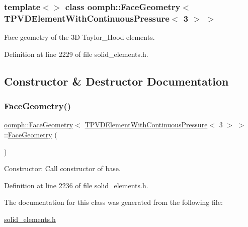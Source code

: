 \subsubsection*{template$<$$>$\newline
class oomph\+::\+Face\+Geometry$<$ T\+P\+V\+D\+Element\+With\+Continuous\+Pressure$<$ 3 $>$ $>$}

Face geometry of the 3D Taylor\+\_\+\+Hood elements. 

Definition at line 2229 of file solid\+\_\+elements.\+h.



\subsection{Constructor \& Destructor Documentation}
\mbox{\label{classoomph_1_1FaceGeometry_3_01TPVDElementWithContinuousPressure_3_013_01_4_01_4_ae0c645d16ae9253ecc4ee97bec72a7c9}} 
\subsubsection{\texorpdfstring{Face\+Geometry()}{FaceGeometry()}}
{\footnotesize\ttfamily \hyperlink{classoomph_1_1FaceGeometry}{oomph\+::\+Face\+Geometry}$<$ \hyperlink{classoomph_1_1TPVDElementWithContinuousPressure}{T\+P\+V\+D\+Element\+With\+Continuous\+Pressure}$<$ 3 $>$ $>$\+::\hyperlink{classoomph_1_1FaceGeometry}{Face\+Geometry} (\begin{DoxyParamCaption}{ }\end{DoxyParamCaption})\hspace{0.3cm}{\ttfamily [inline]}}



Constructor\+: Call constructor of base. 



Definition at line 2236 of file solid\+\_\+elements.\+h.



The documentation for this class was generated from the following file\+:\begin{DoxyCompactItemize}
\item 
\hyperlink{solid__elements_8h}{solid\+\_\+elements.\+h}\end{DoxyCompactItemize}
